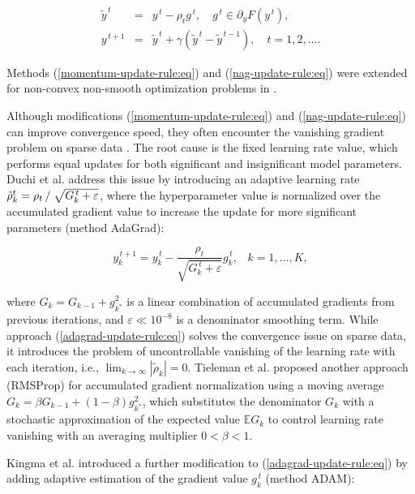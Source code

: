 \begin{eqnarray}
    \label{nag-update-rule:eq}
        \tilde{y}^{\,t} &=& y^{\,t} - \rho_t g^{\,t}, \quad g^{\,t}\in \partial_y F(y^{\,t}), \\
        y^{\,t+1} &=& \tilde{y}^{\,t} + \gamma (\tilde{y}^{\,t} - \tilde{y}^{\,t-1}), \quad t=1,2,\ldots.
\end{eqnarray}

Methods (\ref{momentum-update-rule:eq}) and (\ref{nag-update-rule:eq}) were extended for non-convex non-smooth optimization problems in \cite{mikhalevich2024}.

Although modifications (\ref{momentum-update-rule:eq}) and (\ref{nag-update-rule:eq}) can improve convergence speed, they often encounter the vanishing gradient problem on sparse data \cite{Bottou_Curtis_Nocedal_2018}. The root cause is the fixed learning rate value, which performs equal updates for both significant and insignificant model parameters. Duchi et al. \cite{Duchi_2011} address this issue by introducing an adaptive learning rate $\tilde{\rho}_k^{t} = \rho_t \left/\right. \sqrt{G_k^{\,t} + \varepsilon}$, where the hyperparameter value is normalized over the accumulated gradient value to increase the update for more significant parameters (method AdaGrad):

\begin{equation}
    \label{adagrad-update-rule:eq}
        y^{\,t+1}_k = y^{\,t}_k - \frac{\rho_t}{\sqrt{G_k^{\,t} + \varepsilon}} g^{\,t}_k,\;\;\;k=1,\ldots,K,
\end{equation}

\noindent where $G_k = G_{k-1} + g_{k^*}^2$ is a linear combination of accumulated gradients from previous iterations, and $\varepsilon \ll 10^{-8}$ is a denominator smoothing term. While approach (\ref{adagrad-update-rule:eq}) solves the convergence issue on sparse data, it introduces the problem of uncontrollable vanishing of the learning rate with each iteration, i.e., $\lim_{k \to \infty} | \tilde{\rho}_k | = 0$. Tieleman et al. \cite{tieleman2012rmsprop} proposed another approach (RMSProp) for accumulated gradient normalization using a moving average $G_k = \beta G_{k-1} + (1 - \beta) g_{k^*}^2$, which substitutes the denominator $G_k$ with a stochastic approximation of the expected value $\mathbb{E} G_k$ to control learning rate vanishing with an averaging multiplier $0 < \beta < 1$.

Kingma et al. \cite{kingma2017adam} introduced a further modification to (\ref{adagrad-update-rule:eq}) by adding adaptive estimation of the gradient value $g_{k}^{\,t}$ (method ADAM):

